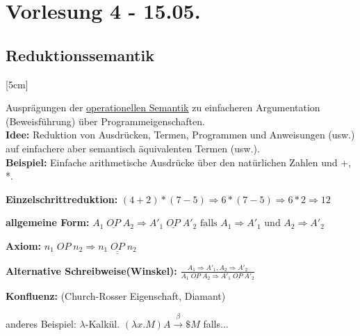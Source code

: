 \section{Vorlesung 4 - 15.05.}
\subsection{Reduktionssemantik}
[5cm]

Ausprägungen der \underline{operationellen Semantik} zu einfacheren Argumentation (Beweisführung) über Programmeigenschaften.\\
\textbf{Idee:} Reduktion von Ausdrücken, Termen, Programmen und Anweisungen (usw.) auf einfachere aber semantisch äquivalenten Termen (usw.).\\
\textbf{Beispiel:} Einfache arithmetische Ausdrücke über den natürlichen Zahlen und +, *.
\begin{compactitem}
	\item[\textbf{Einzelschrittreduktion:}] $(4+2)*(7-5) \Rightarrow 6 * (7-5) \Rightarrow 6 * 2 \Rightarrow 12$
	\item[\textbf{allgemeine Form:}] $A_1\;\underline{OP}\;A_2 \Rightarrow A'_1\;\underline{OP}\;A'_2 \text{ falls } A_1 \Rightarrow A'_1 \text{ und } A_2 \Rightarrow A'_2$
	\item[\textbf{Axiom:}] $n_1\;OP\;n_2 \Rightarrow \underline{n_1\;\underline{OP}\;n_2}$
	\item[\textbf{Alternative Schreibweise(Winskel):}] $\frac {A_1 \Rightarrow A'_1, A_2 \Rightarrow A'_2} {A_1\;\underline{OP}\;A_2 \Rightarrow A'_1\;\underline{OP}\;A'_2}$
	\item[\textbf{Konfluenz:}] (Church-Rosser Eigenschaft, Diamant)\\
\end{compactitem}

anderes Beispiel: $\lambda$-Kalkül. $(\lambda x.M) A \xrightarrow{\beta}  \$ M$ falls...

